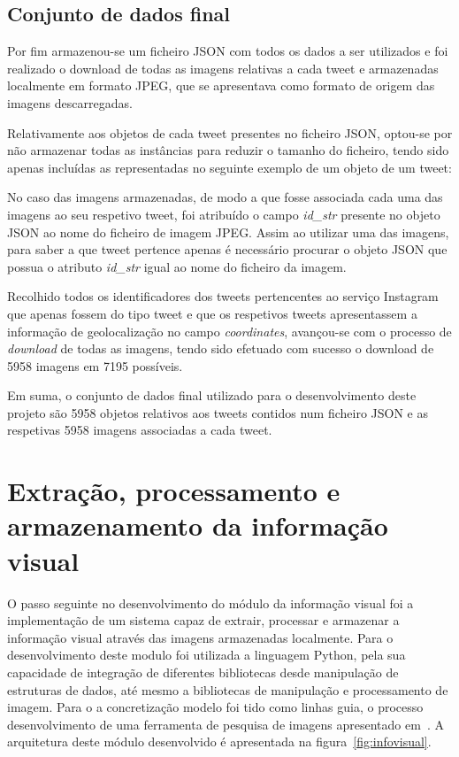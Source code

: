\subsection{Conjunto de dados final}

Por fim armazenou-se um ficheiro JSON com todos os dados a ser utilizados e foi realizado o download de todas as imagens relativas a cada tweet e armazenadas localmente em formato JPEG, que se apresentava como formato de origem das imagens descarregadas. 

Relativamente aos objetos de cada tweet presentes no ficheiro JSON, optou-se por não armazenar todas as instâncias para reduzir o tamanho do ficheiro, tendo sido apenas incluídas as representadas no seguinte exemplo de um objeto de um tweet:



No caso das imagens armazenadas, de modo a que fosse associada cada uma das imagens ao seu respetivo tweet, foi atribuído o campo \textit{id\_str} presente no objeto JSON ao nome do ficheiro de imagem JPEG. Assim ao utilizar uma das imagens, para saber a que tweet pertence apenas é necessário procurar o objeto JSON que possua o atributo \textit{id\_str} igual ao nome do ficheiro da imagem.

Recolhido todos os identificadores dos tweets pertencentes ao serviço Instagram que apenas fossem do tipo tweet e que os respetivos tweets apresentassem a informação de geolocalização no campo \textit{coordinates}, avançou-se com o processo de \textit{download} de todas as imagens, tendo sido efetuado com sucesso o download de 5958 imagens em 7195 possíveis.


Em suma, o conjunto de dados final utilizado para o desenvolvimento deste projeto são 5958 objetos relativos aos tweets contidos num ficheiro JSON e as respetivas 5958 imagens associadas a cada tweet.

\section{Extração, processamento e armazenamento da informação visual} \label{sec:extract}

O passo seguinte no desenvolvimento do módulo da informação visual foi a implementação de um sistema capaz de extrair, processar e armazenar a informação visual através das imagens armazenadas localmente. Para o desenvolvimento deste modulo foi utilizada a linguagem Python, pela sua capacidade de integração de diferentes bibliotecas desde manipulação de estruturas de dados, até mesmo a bibliotecas de manipulação e processamento de imagem. Para o a concretização modelo foi tido como linhas guia, o processo desenvolvimento de uma ferramenta de pesquisa de imagens apresentado em~\cite{Solem2012}. A arquitetura deste módulo desenvolvido é apresentada na figura~\ref{fig:infovisual}.

